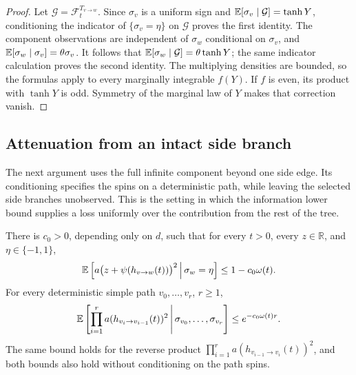 \begin{proof}
Let \(\mathcal G=\mathcal F_t^{T_{v\to w}}\).  Since \(\sigma_v\)
is a uniform sign and \(\mathbb E[\sigma_v\mid\mathcal G]=\tanh Y\),
conditioning the indicator of \(\{\sigma_v=\eta\}\) on
\(\mathcal G\) proves the first identity.  The component observations
are independent of \(\sigma_w\) conditional on \(\sigma_v\), and
\(\mathbb E[\sigma_w\mid\sigma_v]=\theta\sigma_v\).  It follows that
\(\mathbb E[\sigma_w\mid\mathcal G]=\theta\tanh Y\); the same indicator
calculation proves the second identity.  The multiplying densities
are bounded, so the formulas apply to every marginally integrable
\(f(Y)\).  If \(f\) is even, its product with \(\tanh Y\) is odd.
Symmetry of the marginal law of \(Y\) makes that correction vanish.
\end{proof}

\subsection{Attenuation from an intact side branch}

The next argument uses the full infinite component beyond one side
edge.  Its conditioning specifies the spins on a deterministic path,
while leaving the selected side branches unobserved.  This is the
setting in which the information lower bound supplies a loss uniformly
over the contribution from the rest of the tree.

\begin{lemma}
\label{lem:path-attenuation}
There is \(c_0>0\), depending only on \(d\), such that for every
\(t>0\), every \(z\in\mathbb R\), and \(\eta\in\{-1,1\}\),
\begin{equation}
\label{eq:shifted-attenuation}
 \mathbb E\left[
   a\bigl(z+\psi(h_{v\to w}(t))\bigr)^2
       \,\middle|\,\sigma_w=\eta\right]
 \le1-c_0\omega(t).
\end{equation}
For every deterministic simple path \(v_0,\ldots,v_r\), \(r\ge1\),
\begin{equation}
\label{eq:conditional-path-attenuation}
 \mathbb E\left[
   \prod_{i=1}^r a(h_{v_i\to v_{i-1}}(t))^2
       \,\middle|\,\sigma_{v_0},\ldots,\sigma_{v_r}\right]
 \le e^{-c_0\omega(t)r}.
\end{equation}
The same bound holds for the reverse product
\(\prod_{i=1}^r a(h_{v_{i-1}\to v_i}(t))^2\), and both bounds
also hold without conditioning on the path spins.
\end{lemma}

